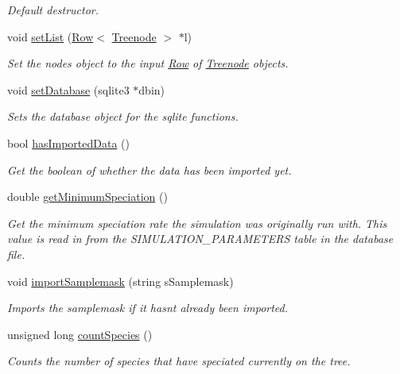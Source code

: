 \begin{DoxyCompactItemize}
\begin{DoxyCompactList}\small\item\em Default destructor. \end{DoxyCompactList}\item 
void \hyperlink{class_treelist_a209bded4d1a38b52de02bd375dc8f214}{set\+List} (\hyperlink{class_row}{Row}$<$ \hyperlink{class_treenode}{Treenode} $>$ $\ast$l)
\begin{DoxyCompactList}\small\item\em Set the nodes object to the input \hyperlink{class_row}{Row} of \hyperlink{class_treenode}{Treenode} objects. \end{DoxyCompactList}\item 
void \hyperlink{class_treelist_a0991cf24ea19b2d99c5bc70f47b45518}{set\+Database} (sqlite3 $\ast$dbin)
\begin{DoxyCompactList}\small\item\em Sets the database object for the sqlite functions. \end{DoxyCompactList}\item 
bool \hyperlink{class_treelist_ae4f75c202f4813f388660577bdbb1b9d}{has\+Imported\+Data} ()
\begin{DoxyCompactList}\small\item\em Get the boolean of whether the data has been imported yet. \end{DoxyCompactList}\item 
double \hyperlink{class_treelist_ad6177750efa83354a844bb7072551227}{get\+Minimum\+Speciation} ()
\begin{DoxyCompactList}\small\item\em Get the minimum speciation rate the simulation was originally run with. This value is read in from the S\+I\+M\+U\+L\+A\+T\+I\+O\+N\+\_\+\+P\+A\+R\+A\+M\+E\+T\+E\+RS table in the database file. \end{DoxyCompactList}\item 
void \hyperlink{class_treelist_a40a8108fe416b9431b232b0e49280e52}{import\+Samplemask} (string s\+Samplemask)
\begin{DoxyCompactList}\small\item\em Imports the samplemask if it hasn\textquotesingle{}t already been imported. \end{DoxyCompactList}\item 
unsigned long \hyperlink{class_treelist_af8888281f584bb1cc6a1543f70b747e9}{count\+Species} ()
\begin{DoxyCompactList}\small\item\em Counts the number of species that have speciated currently on the tree. \end{DoxyCompactList}\item 

\end{DoxyCompactItemize}
